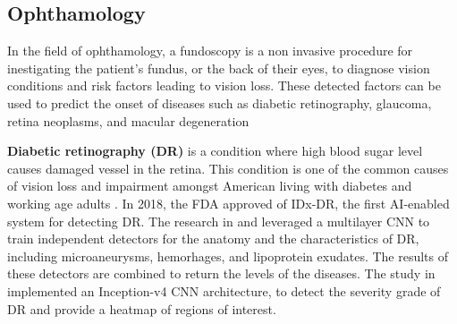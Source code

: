 \documentclass[a4paper]{article}
\begin{document}
\subsection{Ophthamology}
In the field of ophthamology, a fundoscopy is a non invasive procedure for inestigating the patient's fundus, or the back of their eyes, to diagnose vision conditions and risk factors leading to vision loss.
These detected factors can be used to predict the onset of diseases such as diabetic retinography, glaucoma, retina neoplasms, and macular degeneration \cite{kumar_artificial_2023}

\textbf{Diabetic retinography (DR)} is a condition where high blood sugar level causes damaged vessel in the retina. 
This condition is one of the common causes of vision loss and impairment amongst American living with diabetes and working age adults \cite{commissioner_fda_2020,abramoff_pivotal_2018}.
In 2018, the FDA approved of IDx-DR, the first AI-enabled system for detecting DR.
The research in \cite{abramoff_improved_2016} and \cite{abramoff_pivotal_2018} leveraged a multilayer CNN to train independent detectors for the anatomy and the characteristics of DR, including microaneurysms, hemorhages, and lipoprotein exudates.
The results of these detectors are combined to return the levels of the diseases. 
The study in \cite{sayres_using_2019} implemented an Inception-v4 CNN architecture, to detect the severity grade of DR and provide a heatmap of regions of interest.
\end{document}
